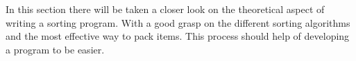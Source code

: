 In this section there will be taken a closer look on the theoretical aspect of writing a sorting program. With a good grasp on the different sorting algorithms and the most effective way to pack items. This process should help of developing a program to be easier.